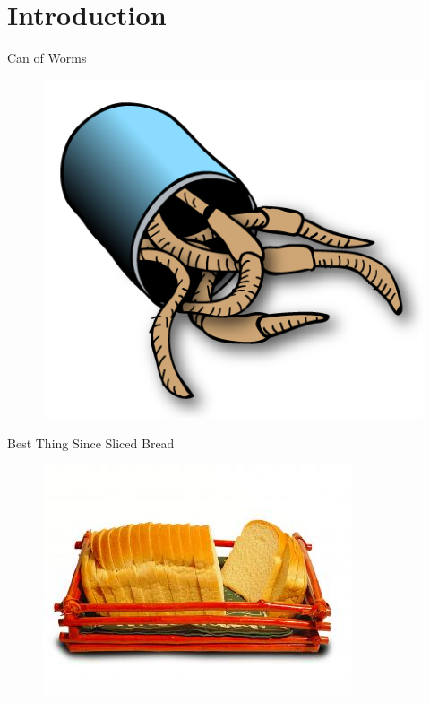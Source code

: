 
\maketitle

\begin{frame}
  \titlepage
\end{frame}

\cleardoublepage

\tableofcontents

\cleardoublepage

\section{Introduction}

\begin{frame}{Can of Worms}
\begin{figure}[!ht]
\centering
\includegraphics[width=0.75\linewidth]{img/canofworms.png}
\end{figure}
\end{frame}

\begin{frame}{Best Thing Since Sliced Bread}


\begin{figure}[!ht]
\centering
\includegraphics[width=1\linewidth]{img/sliced-bread.jpg}
\end{figure}
\end{frame}

